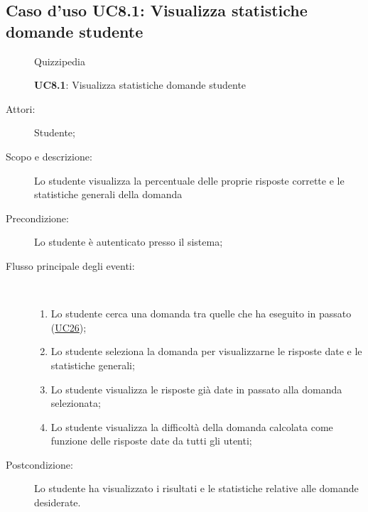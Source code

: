\subsection{Caso d'uso UC8.1: Visualizza statistiche domande studente}
	\begin{figure}[H]
		\centering
		\begin{resizedtikzpicture}{\textwidth}
		\begin{umlsystem}[x=0, fill=lightgray!20]{Quizzipedia}
		\end{umlsystem}
		\end{resizedtikzpicture}
		\caption{\textbf{UC8.1}: Visualizza statistiche domande studente}
		\label{UC8.1}
	\end{figure}
\begin{description}
\item[Attori:] Studente;
\item[Scopo e descrizione:] Lo studente visualizza la percentuale delle proprie risposte corrette e le statistiche generali della domanda
      \item[Precondizione:] Lo studente è autenticato presso il sistema;

        \item[Flusso principale degli eventi:] \ 
 \begin{enumerate}
          \item Lo studente cerca una domanda tra quelle che ha eseguito in passato (\hyperlink{UC26}{UC26});
          \item Lo studente seleziona la domanda per visualizzarne le risposte date e le statistiche generali;
          \item Lo studente visualizza le risposte già date in passato alla domanda selezionata;
          \item Lo studente visualizza la difficoltà della domanda calcolata come funzione delle risposte date da tutti gli utenti;

      \end{enumerate}
    \item[Postcondizione:] Lo studente ha visualizzato i risultati e le statistiche relative alle domande desiderate.
  \end{description}
\hypertarget{UC8.2}{}
